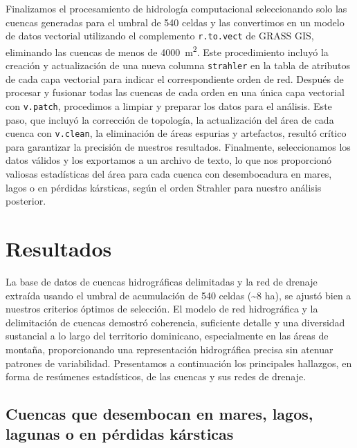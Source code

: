\documentclass[spanish]{article}
\begin{document}
Finalizamos el procesamiento de hidrología computacional seleccionando
solo las cuencas generadas para el umbral de 540 celdas y las
convertimos en un modelo de datos vectorial utilizando el complemento
\texttt{r.to.vect} de GRASS GIS, eliminando las cuencas de menos de
4000~m\textsuperscript{2}. Este procedimiento incluyó la creación y
actualización de una nueva columna \texttt{strahler} en la tabla de
atributos de cada capa vectorial para indicar el correspondiente orden
de red. Después de procesar y fusionar todas las cuencas de cada orden
en una única capa vectorial con \texttt{v.patch}, procedimos a limpiar y
preparar los datos para el análisis. Este paso, que incluyó la
corrección de topología, la actualización del área de cada cuenca con
\texttt{v.clean}, la eliminación de áreas espurias y artefactos, resultó
crítico para garantizar la precisión de nuestros resultados. Finalmente,
seleccionamos los datos válidos y los exportamos a un archivo de texto,
lo que nos proporcionó valiosas estadísticas del área para cada cuenca
con desembocadura en mares, lagos o en pérdidas kársticas, según el
orden Strahler para nuestro análisis posterior.

\hypertarget{resultados}{%
\section{Resultados}\label{resultados}}

La base de datos de cuencas hidrográficas delimitadas y la red de
drenaje extraída usando el umbral de acumulación de 540 celdas
(\textasciitilde8 ha), se ajustó bien a nuestros criterios óptimos de
selección. El modelo de red hidrográfica y la delimitación de cuencas
demostró coherencia, suficiente detalle y una diversidad sustancial a lo
largo del territorio dominicano, especialmente en las áreas de montaña,
proporcionando una representación hidrográfica precisa sin atenuar
patrones de variabilidad. Presentamos a continuación los principales
hallazgos, en forma de resúmenes estadísticos, de las cuencas y sus
redes de drenaje.

\hypertarget{cuencas-que-desembocan-en-mares-lagos-lagunas-o-en-puxe9rdidas-kuxe1rsticas}{%
\subsection{Cuencas que desembocan en mares, lagos, lagunas o en
pérdidas
kársticas}\label{cuencas-que-desembocan-en-mares-lagos-lagunas-o-en-puxe9rdidas-kuxe1rsticas}}
\end{document}
